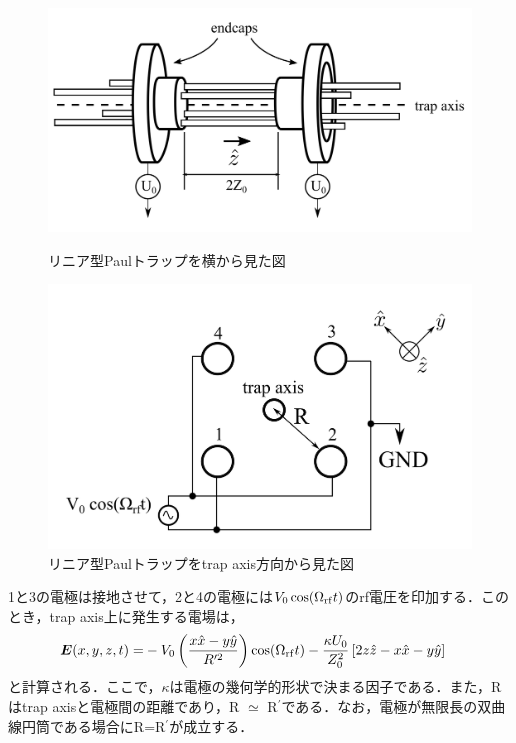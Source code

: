 \begin{figure}
	\begin{minipage}{0.5\linewidth}
		\begin{center}
			\includegraphics[width = 0.98\columnwidth]{./theory/figure/figure1a.png}
			\caption{リニア型Paulトラップを横から見た図}
			\label{fig:figure1a}
		\end{center}
	\end{minipage}
	\begin{minipage}{0.5\linewidth}
		\begin{center}
			\includegraphics[width = 0.98\columnwidth]{./theory/figure/figure1b.png}
			\caption{リニア型Paulトラップをtrap axis方向から見た図}
			\label{fig:figure1b}
		\end{center}
	\end{minipage}
\end{figure}
%
\clearpage
%
1と3の電極は接地させて，2と4の電極には$V_0\cos(\Omega_{\rm rf}t)$のrf電圧を印加する．このとき，trap axis上に発生する電場は，
\large
\begin{align}\label{eq:trapaxis_E}
\bm{E}(x,y,z,t) = &-V_0\left( \frac{x\hat{x} - y\hat{y}}{R^{\prime 2}}\right) \cos(\Omega_{\rm rf} t) - \frac{\kappa U_0}{Z^2_0}\left[ 2z\hat{z} - x\hat{x} - y\hat{y} \right]
\end{align}
\normalsize
と計算される．ここで，$\kappa$は電極の幾何学的形状で決まる因子である．また，Rはtrap axisと電極間の距離であり，R $\simeq$ R$^\prime$である．なお，電極が無限長の双曲線円筒である場合にR=R$^\prime$が成立する\cite{Berkeland_1998}．

